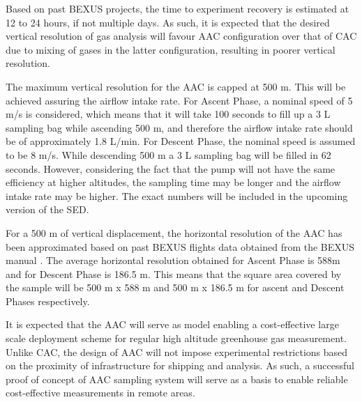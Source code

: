Based on past BEXUS projects, the time to experiment recovery is estimated at 12 to 24 hours, if not multiple days. As such, it is expected that the desired vertical resolution of gas analysis will favour AAC configuration over that of CAC due to mixing of gases in the latter configuration, resulting in poorer vertical resolution.

The maximum vertical resolution for the AAC is capped at 500 m. This will be achieved assuring the airflow intake rate. For Ascent Phase, a nominal speed of 5 m/s is considered, which means that it will take 100 seconds to fill up a 3 L sampling bag while ascending 500 m, and therefore the airflow intake rate should be of approximately 1.8 L/min. For Descent Phase, the nominal speed is assumed to be 8 m/s. While descending 500 m a 3 L sampling bag will be filled in 62 seconds. However, considering the fact that the pump will not have the same efficiency at higher altitudes, the sampling time may be longer and the airflow intake rate may be higher. The exact numbers will be included in the upcoming version of the SED.  

For a 500 m of vertical displacement, the horizontal resolution of the AAC has been approximated based on past BEXUS flights data obtained from the BEXUS manual \cite{BexusManual}. The average horizontal resolution obtained for Ascent Phase is 588m and for Descent Phase is 186.5 m. This means that the square area covered by the sample will be 500 m x 588 m and 500 m x 186.5 m for ascent and Descent Phases respectively.

It is expected that the AAC will serve as model enabling a cost-effective large scale deployment scheme for regular high altitude greenhouse gas measurement. Unlike CAC, the design of AAC will not impose experimental restrictions based on the proximity of infrastructure for shipping and analysis. As such, a successful proof of concept of AAC sampling system will serve as a basis to enable reliable cost-effective measurements in remote areas.


